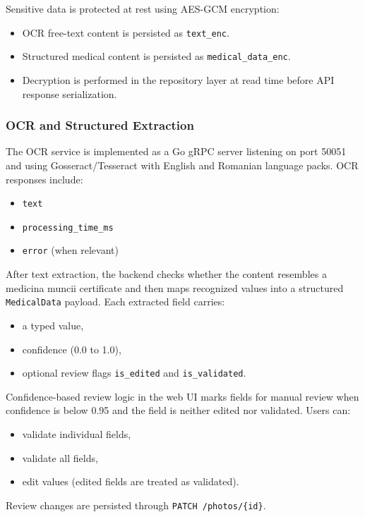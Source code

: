 \documentclass[12pt,a4paper]{article}
\begin{document}
    Sensitive data is protected at rest using AES-GCM encryption:
    \begin{itemize}[leftmargin=*]
        \item OCR free-text content is persisted as \texttt{text\_enc}.
        \item Structured medical content is persisted as
        \texttt{medical\_data\_enc}.
        \item Decryption is performed in the repository layer at read time
        before API response serialization.
    \end{itemize}

    \subsubsection{OCR and Structured Extraction}
    The OCR service is implemented as a Go gRPC server listening on port 50051
    and using Gosseract/Tesseract with English and Romanian language packs.
    OCR responses include:
    \begin{itemize}[leftmargin=*]
        \item \texttt{text}
        \item \texttt{processing\_time\_ms}
        \item \texttt{error} (when relevant)
    \end{itemize}

    After text extraction, the backend checks whether the content resembles a
    medicina muncii certificate and then maps recognized values into a
    structured \texttt{MedicalData} payload. Each extracted field carries:
    \begin{itemize}[leftmargin=*]
        \item a typed value,
        \item confidence (0.0 to 1.0),
        \item optional review flags \texttt{is\_edited} and
        \texttt{is\_validated}.
    \end{itemize}

    Confidence-based review logic in the web UI marks fields for manual review
    when confidence is below 0.95 and the field is neither edited nor
    validated. Users can:
    \begin{itemize}[leftmargin=*]
        \item validate individual fields,
        \item validate all fields,
        \item edit values (edited fields are treated as validated).
    \end{itemize}
    Review changes are persisted through \texttt{PATCH /photos/\{id\}}.
\end{document}
